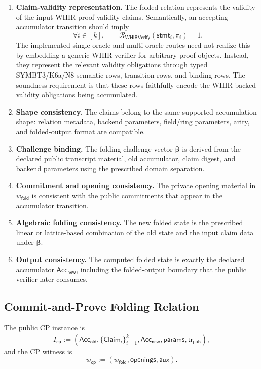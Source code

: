 \documentclass[11pt]{article}
\theoremstyle{definition}
\newcommand{\Acc}{\mathsf{Acc}}
\newcommand{\Rwhir}{\mathcal{R}_{\mathsf{WHIRVerify}}}
\begin{document}
\begin{enumerate}
  \item \textbf{Claim-validity representation.}
The folded relation represents the validity of the input WHIR proof-validity
claims. Semantically, an accepting accumulator transition should imply
\[
  \forall i\in[k],\qquad
  \Rwhir(\mathsf{stmt}_i,\pi_i)=1.
\]
The implemented single-oracle and multi-oracle routes need not realize this by
embedding a generic WHIR verifier for arbitrary proof objects. Instead, they
represent the relevant validity obligations through typed SYMBT3/K6a/N8
semantic rows, transition rows, and binding rows. The soundness requirement is
that these rows faithfully encode the WHIR-backed validity obligations being
accumulated.

  \item \textbf{Shape consistency.}
  The claims belong to the same supported accumulation shape: relation metadata,
  backend parameters, field/ring parameters, arity, and folded-output format are
  compatible.

  \item \textbf{Challenge binding.}
  The folding challenge vector $\boldsymbol{\beta}$ is derived from the declared
  public transcript material, old accumulator, claim digest, and backend
  parameters using the prescribed domain separation.

  \item \textbf{Commitment and opening consistency.}
  The private opening material in $w_{\mathsf{fold}}$ is consistent with the
  public commitments that appear in the accumulator transition.

  \item \textbf{Algebraic folding consistency.}
  The new folded state is the prescribed linear or lattice-based combination of
  the old state and the input claim data under $\boldsymbol{\beta}$.

  \item \textbf{Output consistency.}
  The computed folded state is exactly the declared accumulator
  $\Acc_{\mathsf{new}}$, including the folded-output boundary that the public
  verifier later consumes.
\end{enumerate}

\subsection{Commit-and-Prove Folding Relation}
\label{sec:commit-and-prove-folding-relation}
The public CP instance is
\[
  I_{\mathsf{cp}}
  :=
  \left(
    \Acc_{\mathsf{old}},
    \{\mathsf{Claim}_i\}_{i=1}^k,
    \Acc_{\mathsf{new}},
    \mathsf{params},
    \mathsf{tr}_{\mathsf{pub}}
  \right),
\]
and the CP witness is
\[
  w_{\mathsf{cp}}
  :=
  \left(
    w_{\mathsf{fold}},
    \mathsf{openings},
    \mathsf{aux}
  \right).
\]
\end{document}
